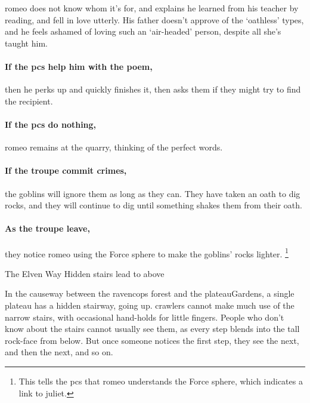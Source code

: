 \begin{multicols}{2}
\begin{speechtext}
\end{speechtext}

\gls{romeo} does not know whom it's for, and explains he learned from his teacher by reading, and fell in love utterly.
His father doesn't approve of the `oathless' types, and he feels ashamed of loving such an `air-headed' person, despite all she's taught him.

\paragraph{If the \glspl{pc} help him with the poem,}
then he perks up and quickly finishes it, then asks them if they might try to find the recipient.

\paragraph{If the \glspl{pc} do nothing,}
\gls{romeo} remains at the quarry, thinking of the perfect words.

\paragraph{If the troupe commit crimes,}
the goblins will ignore them as long as they can.
They have taken an oath to dig rocks, and they will continue to dig until something shakes them from their oath.

\romeo

\showStdSpells

\paragraph{As the troupe leave,}
they notice \gls{romeo} using the Force \gls{sphere} to make the goblins' rocks lighter.%
\footnote{This tells the \glspl{pc} that \gls{romeo} understands the Force \gls{sphere}, which indicates a link to \gls{juliet}.}

{The Elven Way}%
{Hidden stairs lead to  above}%

In the causeway between the \gls{ravencops} forest and the \gls{plateauGardens}, a single plateau has a hidden stairway, going up.
\Glspl{crawler} cannot make much use of the narrow stairs, with occasional hand-holds for little fingers.
People who don't know about the stairs cannot usually see them, as every step blends into the tall rock-face from below.
But once someone notices the first step, they see the next, and then the next, and so on.


\end{multicols}
